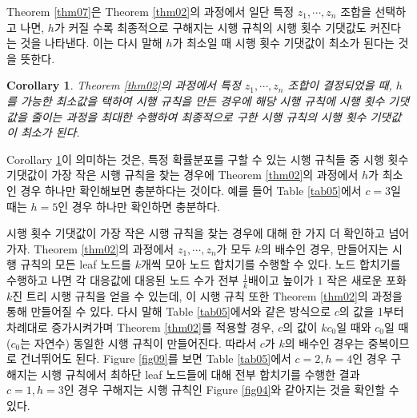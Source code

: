 \documentclass[11pt]{article}
\newtheorem{corollary}{Corollary}[theorem]
\begin{document}
Theorem \ref{thm07}은 Theorem \ref{thm02}의 과정에서 일단 특정 $z_{1}, \cdots, z_{n}$ 조합을 선택하고 나면, $h$가 커질 수록 최종적으로 구해지는 시행 규칙의 시행 횟수 기댓값도 커진다는 것을 나타낸다. 이는 다시 말해 $h$가 최소일 때 시행 횟수 기댓값이 최소가 된다는 것을 뜻한다.

\singlespacing
\begin{corollary}
Theorem \ref{thm02}의 과정에서 특정 $z_{1}, \cdots, z_{n}$ 조합이 결정되었을 때, $h$를 가능한 최소값을 택하여 시행 규칙을 만든 경우에 해당 시행 규칙에 시행 횟수 기댓값을 줄이는 과정을 최대한 수행하여 최종적으로 구한 시행 규칙의 시행 횟수 기댓값이 최소가 된다.
\label{cor0701}
\end{corollary}
\doublespacing

Corollary \ref{cor0701}이 의미하는 것은, 특정 확률분포를 구할 수 있는 시행 규칙들 중 시행 횟수 기댓값이 가장 작은 시행 규칙을 찾는 경우에 Theorem \ref{thm02}의 과정에서 $h$가 최소인 경우 하나만 확인해보면 충분하다는 것이다. 예를 들어 Table \ref{tab05}에서 $c=3$일 때는 $h=5$인 경우 하나만 확인하면 충분하다.

시행 횟수 기댓값이 가장 작은 시행 규칙을 찾는 경우에 대해 한 가지 더 확인하고 넘어가자. Theorem \ref{thm02}의 과정에서 $z_{1}, \cdots, z_{n}$가 모두 $k$의 배수인 경우, 만들어지는 시행 규칙의 모든 leaf 노드를 $k$개씩 모아 노드 합치기를 수행할 수 있다. 노드 합치기를 수행하고 나면 각 대응값에 대응된 노드 수가 전부 $\displaystyle \frac{1}{k}$배이고 높이가 1 작은 새로운 포화 $k$진 트리 시행 규칙을 얻을 수 있는데, 이 시행 규칙 또한 Theorem \ref{thm02}의 과정을 통해 만들어질 수 있다. 다시 말해 Table \ref{tab05}에서와 같은 방식으로 $c$의 값을 1부터 차례대로 증가시켜가며 Theorem \ref{thm02}를 적용할 경우, $c$의 값이 $kc_{0}$일 때와 $c_{0}$일 때 ($c_{0}$는 자연수) 동일한 시행 규칙이 만들어진다. 따라서 $c$가 $k$의 배수인 경우는 중복이므로 건너뛰어도 된다. Figure \ref{fig09}를 보면 Table \ref{tab05}에서 $c=2, h=4$인 경우 구해지는 시행 규칙에서 최하단 leaf 노드들에 대해 전부 합치기를 수행한 결과 $c=1, h=3$인 경우 구해지는 시행 규칙인 Figure \ref{fig04}와 같아지는 것을 확인할 수 있다.\\
\end{document}
